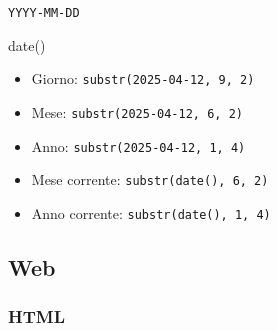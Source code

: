\documentclass[italian,a4paper]{article}
\providecommand{\tightlist}{%
  \setlength{\itemsep}{0pt}\setlength{\parskip}{0pt}}
\begin{document}
\texttt{YYYY-MM-DD}

date()

\begin{itemize}
\tightlist
\item
  Giorno:
  \texttt{substr(\textquotesingle{}2025-04-12\textquotesingle{},\ 9,\ 2)}
\item
  Mese:
  \texttt{substr(\textquotesingle{}2025-04-12\textquotesingle{},\ 6,\ 2)}
\item
  Anno:
  \texttt{substr(\textquotesingle{}2025-04-12\textquotesingle{},\ 1,\ 4)}
\item
  Mese corrente: \texttt{substr(date(),\ 6,\ 2)}
\item
  Anno corrente: \texttt{substr(date(),\ 1,\ 4)}
\end{itemize}

\subsection{Web}\label{web}

\subsubsection{HTML}\label{html}
\end{document}
